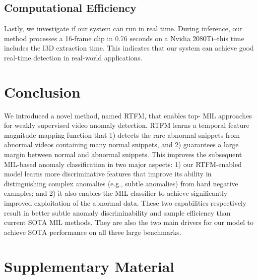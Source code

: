 \documentclass[final]{cvpr}
\newcommand{\beginsupplement}{\setcounter{table}{0}
        \renewcommand{\thetable}{S\arabic{table}}\setcounter{figure}{0}
        \renewcommand{\thesection}{\Alph{section}}
     }
\begin{document}
\vspace{+.1in}
\subsection{Computational Efficiency}

Lastly, we investigate if our system can run in real time. During inference, our method processes a 16-frame clip in 0.76 seconds on a Nvidia 2080Ti--this time includes the I3D extraction time. This indicates that our system can achieve good real-time detection in real-world applications. 






















\section{Conclusion}

We introduced a novel method, named RTFM, that enables top- MIL approaches for weakly supervised video anomaly detection. RTFM learns a temporal feature magnitude mapping function that 1) detects the rare abnormal snippets from abnormal videos containing many normal snippets, and 2) guarantees a large margin between normal and abnormal snippets. This improves the subsequent MIL-based anomaly classification in two major aspects: 1) our RTFM-enabled model learns more discriminative features that improve its ability in distinguishing complex anomalies (e.g., subtle anomalies) from hard negative examples; and 2) it also enables the MIL classifier to achieve significantly improved exploitation of the abnormal data. These two capabilities respectively result in better subtle anomaly discriminability and sample efficiency than current SOTA MIL methods. They are also the two main drivers for our model to achieve SOTA performance on all three large benchmarks.




\newpage
{\small


}

\newpage
\beginsupplement
\setcounter{section}{0}
\section{Supplementary Material}
\setcounter{equation}{0}
\setcounter{figure}{0}
\setcounter{table}{0}
\setcounter{page}{1}
\makeatletter
\renewcommand{\theequation}{S\arabic{equation}}
\renewcommand{\thefigure}{S\arabic{figure}}
\end{document}
